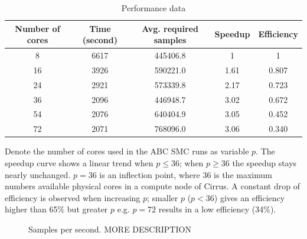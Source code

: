\begin{table}[H]
    \centering
    \begin{tabular}{|c c c c c|}
        \hline
        Number of cores & Time (second) & Avg. required samples & Speedup & Efficiency \\ [0.5ex]
        \hline\hline
        8               & 6617          & 445406.8              & 1       & 1          \\
        16              & 3926          & 590221.0              & 1.61    & 0.807      \\
        24              & 2921          & 573339.8              & 2.17    & 0.723      \\
        36              & 2096          & 446948.7              & 3.02    & 0.672      \\
        54              & 2076          & 640404.9              & 3.05    & 0.452      \\
        72              & 2071          & 768096.0              & 3.06    & 0.340      \\
        \hline
    \end{tabular}
    \caption{Performance data}
    \label{table:performance}
\end{table}

Denote the number of cores used in the ABC SMC runs as variable $p$. The speedup curve shows a linear trend when $p\leq 36$; when $p\geq 36$ the speedup stays nearly unchanged. $p=36$ is an inflection point, where 36 is the maximum numbers available physical cores in a compute node of Cirrus. A constant drop of efficiency is observed when increasing $p$; smaller $p$ ($p<36$) gives an efficiency higher than 65\% but greater $p$ e.g. $p=72$ results in a low efficiency (34\%).

\begin{figure}[h]
    \begin{center}
    \end{center}

    \caption[TODO]{Samples per second. MORE DESCRIPTION}
    \label{fig:sample_per_sec}
\end{figure}

